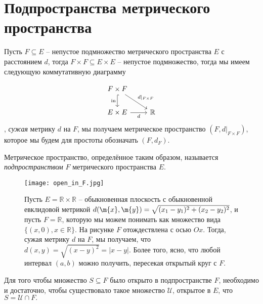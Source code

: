 \section{Подпространства метрического пространства}

Пусть $F \subseteq E$ -- непустое подмножество метрического пространства $E$ с расстоянием $d$, тогда $F \times F \subseteq E \times E$ -- непустое подмножество, тогда мы имеем следующую коммутативную диаграмму

\[
  \begin{tikzcd}
    F \times F \arrow[hook]{d}[left]{\mathrm{in}} \arrow{dr}{d|_{F \times F}} &  \\
    E \times E \arrow{r}[below]{d} & \mathbb{R}
  \end{tikzcd}
\]
\ie, \textit{сужая} метрику $d$ на $F$, мы получаем метрическое пространство $(F,d|_{F \times F})$, которое мы будем для простоты обозначать $(F, d_F)$.

\begin{definition}
    Метрическое пространство, определённое таким образом, называется \textit{подпространством} $F$ метрического пространства $E$.
\end{definition}

\begin{figure}[h!]
    \centering
    \texttt{[image: open\_in\_F.jpg]}
    \caption{Пусть $E = \mathbb{R} \times \mathbb{R}$ -- обыкновенная плоскость с обыкновенной евклидовой метрикой $d(\m{x},\m{y}) = \sqrt{(x_1 - y_1)^2+ (x_2 - y_2)^2}$, и пусть $F = \mathbb{R}$, которую мы можем понимать как множество вида $\{(x,0), x\in \mathbb{R}\}$. На рисунке $F$ отождествлена с осью $Ox$. Тогда, сужая метрику $d$ на $F$, мы получаем, что $d(x,y) = \sqrt{(x-y)^2} = |x-y|$. Более того, ясно, что любой интервал $(a,b)$ можно получить, пересекая открытый круг с $F.$}
    \label{fig:enter-label}
\end{figure}


\begin{proposition}\label{open_in_subset}
    Для того чтобы множество $S \subseteq F$ было открыто в подпространстве $F$, необходимо и достаточно, чтобы существовало такое множество $\mathscr{U}$, открытое в $E$, что $S = \mathscr{U} \cap F.$
\end{proposition}

